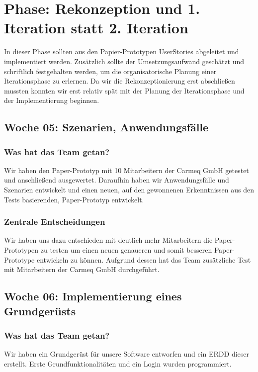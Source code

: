 \documentclass{article}
\begin{document}
\section{Phase: Rekonzeption und 1. Iteration statt 2. Iteration}

In dieser Phase sollten aus den Papier-Prototypen UserStories abgeleitet und implementiert werden. Zus\"atzlich sollte der Umsetzungsaufwand gesch\"atzt und schriftlich festgehalten werden, um die organisatorische Planung einer Iterationsphase zu erlernen. Da wir die Rekonzeptionierung erst abschlie\ss en mussten konnten wir erst relativ sp\"at mit der Planung der Iterationsphase und der Implementierung beginnen.

\subsection{Woche 05: Szenarien, Anwendungsf\"alle}

\subsubsection{Was hat das Team getan?}

Wir haben den Paper-Prototyp mit 10 Mitarbeitern der Carmeq GmbH getestet und anschlie\ss end ausgewertet. Daraufhin haben wir Anwendungsf\"alle und Szenarien entwickelt und einen neuen, auf den gewonnenen Erkenntnissen aus den Tests basierenden, Paper-Prototyp entwickelt.

\subsubsection{Zentrale Entscheidungen}

Wir haben uns dazu entschieden mit deutlich mehr Mitarbeitern die Paper-Prototypen zu testen um einen neuen genaueren und somit besseren Paper-Prototype entwickeln zu k\"onnen. Aufgrund dessen hat das Team zus\"atzliche Test mit Mitarbeitern der Carmeq GmbH durchgef\"uhrt.

\subsection{Woche 06: Implementierung eines Grundger\"usts}

\subsubsection{Was hat das Team getan?}

Wir haben ein Grundger\"ust f\"ur unsere Software entworfen und ein ERDD dieser erstellt. Erste Grundfunktionalit\"aten und ein Login wurden programmiert.
\end{document}
